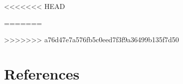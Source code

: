 \documentclass{../../hid-sample/tex/format/laszewski}
\begin{document}


<<<<<<< HEAD

=======

>>>>>>> a76d47e7a576fb5c0eed7f3f9a36499b135f7d50




\section*{References}
\printbibliography[heading=bibempty]

\cleardoublepage
{}
\setlength{\columnsep}{0.75cm}
\printindex
\end{document}
